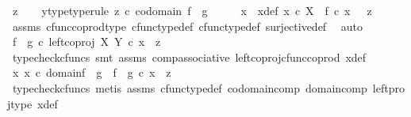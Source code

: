 \begin{isabellebody}
\ z\isanewline
\ \ \isamarkupfalse%
\ y{\isacharunderscore}{\kern0pt}type{\isacharbrackleft}{\kern0pt}type{\isacharunderscore}{\kern0pt}rule{\isacharbrackright}{\kern0pt}{\isacharcolon}{\kern0pt}\ {\isachardoublequoteopen}z\ {\isasymin}\isactrlsub c\ codomain\ {\isacharparenleft}{\kern0pt}f\ {\isasymamalg}\ g{\isacharparenright}{\kern0pt}{\isachardoublequoteclose}\isanewline
\ \ \isamarkupfalse%
\ \isamarkupfalse%
\ x\ \ x{\isacharunderscore}{\kern0pt}def{\isacharcolon}{\kern0pt}\ {\isachardoublequoteopen}x\ {\isasymin}\isactrlsub c\ X\ {\isasymand}\ f\ {\isasymcirc}\isactrlsub c\ x\ \ {\isacharequal}{\kern0pt}\ z{\isachardoublequoteclose}\isanewline
\ \ \ \ \isamarkupfalse%
\ assms\ cfunc{\isacharunderscore}{\kern0pt}coprod{\isacharunderscore}{\kern0pt}type\ cfunc{\isacharunderscore}{\kern0pt}type{\isacharunderscore}{\kern0pt}def\ cfunc{\isacharunderscore}{\kern0pt}type{\isacharunderscore}{\kern0pt}def\ surjective{\isacharunderscore}{\kern0pt}def\ \isamarkupfalse%
\ auto\isanewline
\ \ \isamarkupfalse%
\ {\isachardoublequoteopen}{\isacharparenleft}{\kern0pt}f\ {\isasymamalg}\ g{\isacharparenright}{\kern0pt}\ {\isasymcirc}\isactrlsub c\ {\isacharparenleft}{\kern0pt}left{\isacharunderscore}{\kern0pt}coproj\ X\ Y\ {\isasymcirc}\isactrlsub c\ x{\isacharparenright}{\kern0pt}\ {\isacharequal}{\kern0pt}\ z{\isachardoublequoteclose}\isanewline
\ \ \ \ \isamarkupfalse%
\ {\isacharparenleft}{\kern0pt}typecheck{\isacharunderscore}{\kern0pt}cfuncs{\isacharcomma}{\kern0pt}\ smt\ assms\ comp{\isacharunderscore}{\kern0pt}associative{}\ left{\isacharunderscore}{\kern0pt}coproj{\isacharunderscore}{\kern0pt}cfunc{\isacharunderscore}{\kern0pt}coprod\ x{\isacharunderscore}{\kern0pt}def{\isacharparenright}{\kern0pt}\isanewline
\ \ \isamarkupfalse%
\ \isamarkupfalse%
\ {\isachardoublequoteopen}{\isasymexists}x{\isachardot}{\kern0pt}\ x\ {\isasymin}\isactrlsub c\ domain{\isacharparenleft}{\kern0pt}f\ {\isasymamalg}\ g{\isacharparenright}{\kern0pt}\ {\isasymand}\ f\ {\isasymamalg}\ g\ {\isasymcirc}\isactrlsub c\ x\ {\isacharequal}{\kern0pt}\ z{\isachardoublequoteclose}\isanewline
\ \ \ \ \isamarkupfalse%
\ {\isacharparenleft}{\kern0pt}typecheck{\isacharunderscore}{\kern0pt}cfuncs{\isacharcomma}{\kern0pt}\ metis\ assms{\isacharparenleft}{\kern0pt}{}{\isacharcomma}{\kern0pt}{}{\isacharparenright}{\kern0pt}\ cfunc{\isacharunderscore}{\kern0pt}type{\isacharunderscore}{\kern0pt}def\ codomain{\isacharunderscore}{\kern0pt}comp\ domain{\isacharunderscore}{\kern0pt}comp\ left{\isacharunderscore}{\kern0pt}proj{\isacharunderscore}{\kern0pt}type\ x{\isacharunderscore}{\kern0pt}def{\isacharparenright}{\kern0pt}\isanewline

\end{isabellebody}
